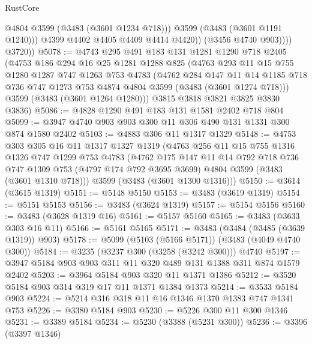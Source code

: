 \begin{lexlean}{RustCore}
\begin{coremodule}
                      @4804
                      @3599
                      (@3483 (@3601 @1234 @718)))
                    @3599
                    (@3483 (@3601 @1191 @1240)))
                  @4399
                  @4402
                  @4405
                  @4409
                  @4414
                  @4420))
              (@3456 @4740 @903))))
        @3720))
@5078 := @4743
    @295
    @491
    @183
    @131
    @1281
    @1290
    @718
    @2405
    (@4753
      @186
      @294
      @16
      @25
      @1281
      @1288
      @825
      (@4763
        @293
        @11
        @15
        @755
        @1280
        @1287
        @747
        @1263
        @753
        @4783
        (@4762
          @284
          @147
          @11
          @14
          @1185
          @718
          @736
          @747
          @1273
          @753
          @4874
          @4804
          @3599
          (@3483 (@3601 @1274 @718)))
        @3599
        (@3483 (@3601 @1264 @1280)))
      @3815
      @3818
      @3821
      @3825
      @3830
      @3836)
@5086 := @4828 @1290 @491 @183 @131 @1581 @2402 @718 @804
@5099 := @3947 @4740 @903 @903 @300 @11 @306 @490 @131 @1331 @300 @874 @1580 @2402
@5103 := @4883 @306 @11 @1317 @1329
@5148 := @4753
    @303
    @305
    @16
    @11
    @1317
    @1327
    @1319
    (@4763
      @256
      @11
      @15
      @755
      @1316
      @1326
      @747
      @1299
      @753
      @4783
      (@4762
        @175
        @147
        @11
        @14
        @792
        @718
        @736
        @747
        @1309
        @753
        (@4797 @174 @792 @3695 @3699)
        @4804
        @3599
        (@3483 (@3601 @1310 @718)))
      @3599
      (@3483 (@3601 @1300 @1316)))
@5150 := @3614 (@3615 @1319)
@5151 := @5148 @5150
@5153 := @3483 (@3619 @1319)
@5154 := @5151 @5153
@5156 := @3483 (@3624 @1319)
@5157 := @5154 @5156
@5160 := @3483 (@3628 @1319 @16)
@5161 := @5157 @5160
@5165 := @3483 (@3633 @303 @16 @11)
@5166 := @5161 @5165
@5171 := @3483 (@3484 (@3485 (@3639 @1319)) @903)
@5178 := @5099 (@5103 (@5166 @5171)) (@3483 (@4049 @4740 @300))
@5184 := @3235 (@3237 @300 (@3258 (@3242 @300))) @4740
@5197 := @3947 @5184 @903 @903 @311 @11 @320 @489 @131 @1388 @311 @874 @1579 @2402
@5203 := @3964 @5184 @903 @320 @11 @1371 @1386
@5212 := @3520 @5184 @903 @314 @319 @17 @11 @1371 @1384 @1373
@5214 := @3533 @5184 @903
@5224 := @5214 @316 @318 @11 @16 @1346 @1370 @1383 @747 @1341 @753
@5226 := @3380 @5184 @903
@5230 := @5226 @300 @11 @300 @1346
@5231 := @3389 @5184
@5234 := @5230 (@3388 (@5231 @300))
@5236 := @3396 (@3397 @1346)

\end{coremodule}
\end{lexlean}
